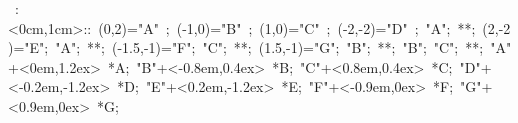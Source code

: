 %

\hbox{
\xy    <1cm,0cm>:<0cm,1cm>::
       (0,2)="A" ; (-1,0)="B" ; (1,0)="C" ; (-2,-2)="D" ; "A";  **\dir{-}; 
       (2,-2)="E"; "A"; **\dir{-}; (-1.5,-1)="F"; "C"; **\dir{-}; 
       (1.5,-1)="G"; "B"; **\dir{-}; "B"; "C"; **\dir{-};
       "A"+<0em,1.2ex> *{A}; "B"+<-0.8em,0.4ex> *{B}; "C"+<0.8em,0.4ex> *{C}; 
       "D"+<-0.2em,-1.2ex> *{D}; "E"+<0.2em,-1.2ex> *{E}; "F"+<-0.9em,0ex> *{F}; 
       "G"+<0.9em,0ex> *{G};
       \endxy}
	   
